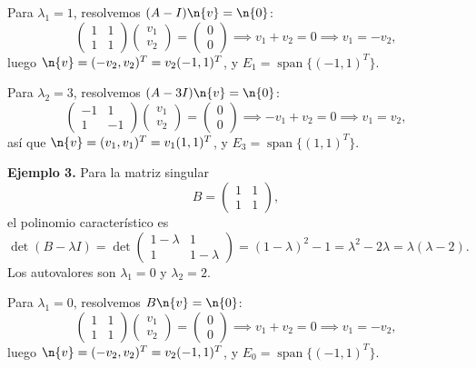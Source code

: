 Para $\lambda_1 = 1$, resolvemos $(A - I)\n{v} = \n{0}$:
\[
\begin{pmatrix} 1 & 1 \\ 1 & 1 \end{pmatrix} \begin{pmatrix} v_1 \\ v_2 \end{pmatrix} = \begin{pmatrix} 0 \\ 0 \end{pmatrix}
\implies v_1 + v_2 = 0 \implies v_1 = -v_2,
\]
luego $\n{v} = (-v_2, v_2)^T = v_2(-1,1)^T$, y $E_1 = \operatorname{span}\{(-1,1)^T\}$.

Para $\lambda_2 = 3$, resolvemos $(A - 3I)\n{v} = \n{0}$:
\[
\begin{pmatrix} -1 & 1 \\ 1 & -1 \end{pmatrix} \begin{pmatrix} v_1 \\ v_2 \end{pmatrix} = \begin{pmatrix} 0 \\ 0 \end{pmatrix}
\implies -v_1 + v_2 = 0 \implies v_1 = v_2,
\]
así que $\n{v} = (v_1, v_1)^T = v_1(1,1)^T$, y $E_3 = \operatorname{span}\{(1,1)^T\}$.

\medskip

\noindent \textbf{Ejemplo 3.} Para la matriz singular
\[
B = \begin{pmatrix} 1 & 1 \\ 1 & 1 \end{pmatrix},
\]
el polinomio característico es
\[
\det(B - \lambda I) = \det\begin{pmatrix} 1-\lambda & 1 \\ 1 & 1-\lambda \end{pmatrix} = (1-\lambda)^2 - 1 = \lambda^2 - 2\lambda = \lambda(\lambda - 2).
\]
Los autovalores son $\lambda_1 = 0$ y $\lambda_2 = 2$.

Para $\lambda_1 = 0$, resolvemos $B\n{v} = \n{0}$:
\[
\begin{pmatrix} 1 & 1 \\ 1 & 1 \end{pmatrix} \begin{pmatrix} v_1 \\ v_2 \end{pmatrix} = \begin{pmatrix} 0 \\ 0 \end{pmatrix}
\implies v_1 + v_2 = 0 \implies v_1 = -v_2,
\]
luego $\n{v} = (-v_2, v_2)^T = v_2(-1,1)^T$, y $E_0 = \operatorname{span}\{(-1,1)^T\}$.

